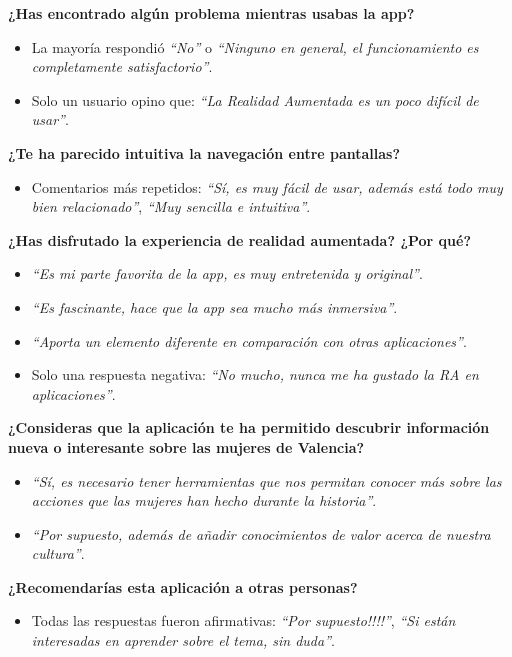 \textbf{¿Has encontrado algún problema mientras usabas la app?}
\begin{itemize}
    \item La mayoría respondió \textit{“No”} o \textit{“Ninguno en general, el funcionamiento es completamente satisfactorio”}.
    \item Solo un usuario opino que: \textit{“La Realidad Aumentada es un poco difícil de usar”}.
\end{itemize}

\textbf{¿Te ha parecido intuitiva la navegación entre pantallas?}
\begin{itemize}
    \item Comentarios más repetidos: \textit{“Sí, es muy fácil de usar, además está todo muy bien relacionado”}, \textit{“Muy sencilla e intuitiva”}.
\end{itemize}

\textbf{¿Has disfrutado la experiencia de realidad aumentada? ¿Por qué?}
\begin{itemize}
    \item \textit{“Es mi parte favorita de la app, es muy entretenida y original”}.
    \item \textit{“Es fascinante, hace que la app sea mucho más inmersiva”}.
    \item \textit{“Aporta un elemento diferente en comparación con otras aplicaciones”}.
    \item Solo una respuesta negativa: \textit{“No mucho, nunca me ha gustado la RA en aplicaciones”}.
\end{itemize}

\textbf{¿Consideras que la aplicación te ha permitido descubrir información nueva o interesante sobre las mujeres de Valencia?}
\begin{itemize}
    \item \textit{“Sí, es necesario tener herramientas que nos permitan conocer más sobre las acciones que las mujeres han hecho durante la historia”}.
    \item \textit{“Por supuesto, además de añadir conocimientos de valor acerca de nuestra cultura”}.
\end{itemize}

\textbf{¿Recomendarías esta aplicación a otras personas?}
\begin{itemize}
    \item Todas las respuestas fueron afirmativas: \textit{“Por supuesto!!!!”}, \textit{“Si están interesadas en aprender sobre el tema, sin duda”}.
\end{itemize}

